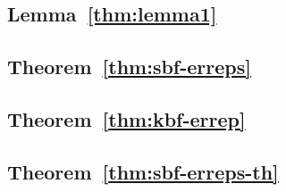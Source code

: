 \label{sec:keyless-proof}
\label{sec:proof/sbf-erreps}
\label{sec:proof/kbf-errep}
\label{sec:proof/sbf-erreps-th}

\subsection*{Lemma~\ref{thm:lemma1}}


\subsection*{Theorem~\ref{thm:sbf-erreps}}


\subsection*{Theorem~\ref{thm:kbf-errep}}


\subsection*{Theorem~\ref{thm:sbf-erreps-th}}

